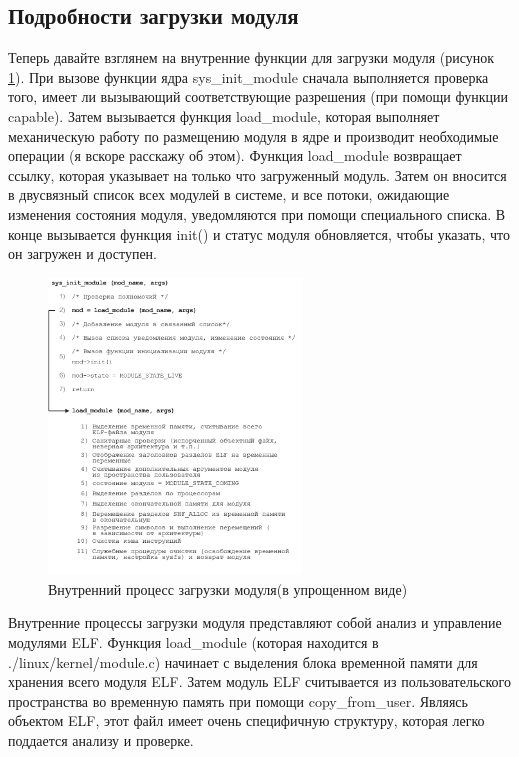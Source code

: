 \subsection{Подробности загрузки модуля}
Теперь давайте взглянем на внутренние функции для загрузки модуля (рисунок \ref{fig:an04}). При вызове функции ядра sys\_init\_module сначала выполняется проверка того, имеет ли вызывающий соответствующие разрешения (при помощи функции capable). Затем вызывается функция load\_module, которая выполняет механическую работу по размещению модуля в ядре и производит необходимые операции (я вскоре расскажу об этом). Функция load\_module возвращает ссылку, которая указывает на только что загруженный модуль. Затем он вносится в двусвязный список всех модулей в системе, и все потоки, ожидающие изменения состояния модуля, уведомляются при помощи специального списка. В конце вызывается функция init() и статус модуля обновляется, чтобы указать, что он загружен и доступен.
\begin{figure}[h!]
	\centering
	\includegraphics[width=0.6\textwidth]{img/4.png}
	\caption{ Внутренний процесс загрузки модуля(в упрощенном виде)}
	\label{fig:an04}
\end{figure}
Внутренние процессы загрузки модуля представляют собой анализ и управление модулями ELF. Функция load\_module (которая находится в ./linux/kernel/module.c) начинает с выделения блока временной памяти для хранения всего модуля ELF. Затем модуль ELF считывается из пользовательского пространства во временную память при помощи copy\_from\_user. Являясь объектом ELF, этот файл имеет очень специфичную структуру, которая легко поддается анализу и проверке.

